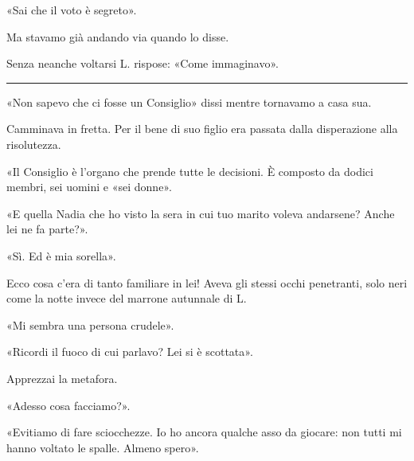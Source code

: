 «Sai che il voto è segreto».

Ma stavamo già andando via quando lo disse.

Senza neanche voltarsi L. rispose: «Come immaginavo».

\plainbreak{1}

«Non sapevo che ci fosse un Consiglio» dissi mentre tornavamo a casa sua.

Camminava in fretta. Per il bene di suo figlio era passata dalla disperazione alla risolutezza.

«Il Consiglio è l'organo che prende tutte le decisioni. È composto da dodici membri, sei uomini e
«sei donne».

«E quella Nadia che ho visto la sera in cui tuo marito voleva andarsene? Anche lei ne fa parte?».

«Sì. Ed è mia sorella».

Ecco cosa c'era di tanto familiare in lei! Aveva gli stessi occhi penetranti, solo neri come la
notte invece del marrone autunnale di L.

«Mi sembra una persona crudele».

«Ricordi il fuoco di cui parlavo? Lei si è scottata».

Apprezzai la metafora.

«Adesso cosa facciamo?».

«Evitiamo di fare sciocchezze. Io ho ancora qualche asso da giocare: non tutti mi hanno voltato le
spalle. Almeno spero».
